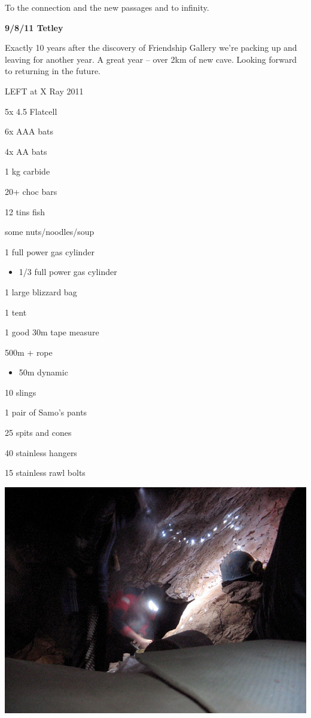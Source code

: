 To the connection and the new passages and to infinity.

\textbf{9/8/11 Tetley}

Exactly 10 years after the discovery of Friendship Gallery we're packing
up and leaving for another year. A great year -- over 2km of new cave.
Looking forward to returning in the future.

LEFT at X Ray 2011

5x 4.5 Flatcell

6x AAA bats

4x AA bats

1 kg carbide

20+ choc bars

12 tins fish

some nuts/noodles/soup

1 full power gas cylinder

\begin{itemize}
\tightlist
\item
  1/3 full power gas cylinder
\end{itemize}

1 large blizzard bag

1 tent

1 good 30m tape measure

500m + rope

\begin{itemize}
\tightlist
\item
  50m dynamic
\end{itemize}

10 slings

1 pair of Samo's pants

25 spits and cones

40 stainless hangers

15 stainless rawl bolts

\includegraphics{UgLog1012/58.png}

